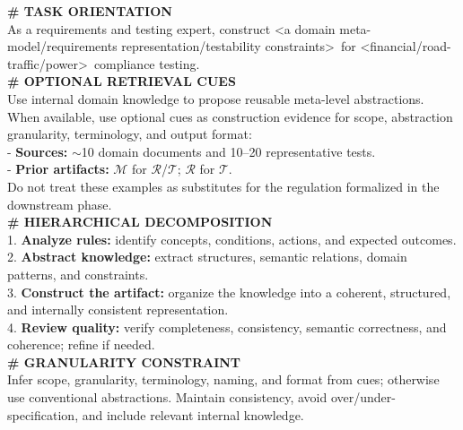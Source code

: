\begin{tcolorbox}[colback=orange!5, colframe=orange!30!black, title=\textbf{Knowledge Explication Prompt Template}, fonttitle=\bfseries\small, fontupper=\footnotesize,
    left=1mm,                       %
    right=1mm,                      %
    top=1mm,                        %
    bottom=1mm,                     %
    boxsep=1mm,                     %
    arc=2mm,                        %
    rounded corners,                 %
    breakable %
]
\sf 
{\small \textbf{\# TASK ORIENTATION}} \\
As a requirements and testing expert, construct \textless a domain meta-model/requirements representation/testability constraints\textgreater\ for \textless financial/road-traffic/power\textgreater\ compliance testing.\\
{\small \textbf{\# OPTIONAL RETRIEVAL CUES}} \\
Use internal domain knowledge to propose reusable meta-level abstractions. When
available, use optional cues as construction evidence for scope, abstraction
granularity, terminology, and output format:\\
- \textbf{Sources:} $\sim$10 domain documents and 10--20 representative tests.\\
- \textbf{Prior artifacts:} $\mathcal{M}$ for $\mathcal{R}$/$\mathcal{T}$; $\mathcal{R}$ for $\mathcal{T}$.\\
Do not treat these examples as substitutes for the regulation formalized in the downstream phase.\\
{\small \textbf{\# HIERARCHICAL DECOMPOSITION}} \\
1. \textbf{Analyze rules:} identify concepts, conditions, actions, and expected outcomes.\\
2. \textbf{Abstract knowledge:} extract structures, semantic relations, domain patterns, and constraints.\\
3. \textbf{Construct the artifact:} organize the knowledge into a coherent, structured, and internally consistent representation.\\
4. \textbf{Review quality:} verify completeness, consistency, semantic correctness, and coherence; refine if needed.\\
{\small \textbf{\# GRANULARITY CONSTRAINT}} \\
Infer scope, granularity, terminology, naming, and format from cues; otherwise use conventional abstractions. Maintain consistency, avoid over/under-specification, and include relevant internal knowledge.
\end{tcolorbox}


